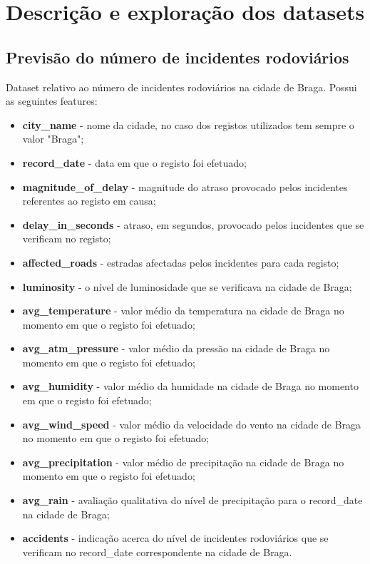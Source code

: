 \section{Descrição e exploração dos datasets}

\subsection{Previsão do número de incidentes rodoviários}
Dataset relativo ao número de incidentes rodoviários na cidade de Braga.
Possui as seguintes features: 
\begin{itemize}
    \item \textbf{city\_name} - nome da cidade, no caso dos registos utilizados tem sempre o valor "Braga";
    \item \textbf{record\_date} - data em que o registo foi efetuado;
    \item \textbf{magnitude\_of\_delay} - magnitude do atraso provocado pelos incidentes referentes ao registo em causa;
    \item \textbf{delay\_in\_seconds} - atraso, em segundos, provocado pelos incidentes que se verificam no registo;
    \item \textbf{affected\_roads} - estradas afectadas pelos incidentes para cada registo;
    \item \textbf{luminosity} - o nível de luminosidade que se verificava na cidade de Braga;
    \item \textbf{avg\_temperature} - valor médio da temperatura na cidade de Braga no momento em que o registo foi efetuado;
    \item \textbf{avg\_atm\_pressure} - valor médio da pressão na cidade de Braga no momento em que o registo foi efetuado;
    \item \textbf{avg\_humidity} - valor médio da humidade na cidade de Braga no momento em que o registo foi efetuado;
    \item \textbf{avg\_wind\_speed} - valor médio da velocidade do vento na cidade de Braga no momento em que o registo foi efetuado;
    \item \textbf{avg\_precipitation} - valor médio de precipitação na cidade de Braga no momento em que o registo foi efetuado;
    \item \textbf{avg\_rain} - avaliação qualitativa do nível de precipitação para o record\_date na cidade de Braga;
    \item \textbf{accidents} - indicação acerca do nível de incidentes rodoviários que se verificam no record\_date correspondente na cidade de Braga.
\end{itemize}

